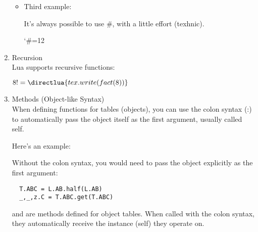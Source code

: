 \begin{enumerate}[label=(\alph*)]
\begin{itemize}
  \begin{tkzexample}[latex=.2\textwidth]
  \end{tkzexample}


\item   Third example:

It's always possible to use \#, with a little effort (texhnic).

\begin{tkzexample}[latex=.2\textwidth]
 \bgroup
 \catcode`\#=12
 \egroup
\end{tkzexample}
\end{itemize}


\item  Recursion\\

Lua supports recursive functions:

\begin{tkzexample}[latex=.4\textwidth]
  \newcommand*{\luafact}[1]{\directlua{
    tex.write(fact(\the\numexpr(#1)\relax))}%
  }
  $8! = \luafact{8}$
\end{tkzexample}



\item Methods (Object-like Syntax)\\

When defining functions for tables (objects), you can use the colon syntax (:) to automatically pass the object itself as the first argument, usually called self.

Here's an example:


\begin{tkzexample}[latex = .2\textwidth]
\end{tkzexample}

Without the colon syntax, you would need to pass the object explicitly as the first argument:

\begin{verbatim}
  T.ABC = L.AB.half(L.AB)
  _,_,z.C = T.ABC.get(T.ABC)
\end{verbatim}

 and  are methods defined for object tables. When called with the colon syntax, they automatically receive the instance (self) they operate on.
\end{enumerate}

